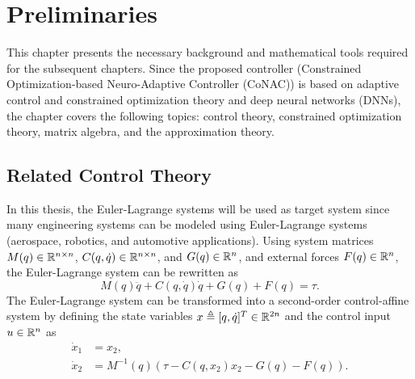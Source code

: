 
\chapter{Preliminaries} \label{chapter2}

This chapter presents the necessary background and mathematical tools required for the subsequent chapters.
Since the proposed controller (Constrained Optimization-based Neuro-Adaptive Controller (CoNAC)) is based on adaptive control and constrained optimization theory and deep neural networks (DNNs), the chapter covers the following topics: control theory, constrained optimization theory, matrix algebra, and the approximation theory.

\section{Related Control Theory} \label{chap2:sec:ctrl}


In this thesis, the Euler-Lagrange systems will be used as target system since many engineering systems can be modeled using Euler-Lagrange systems (\eg aerospace, robotics, and automotive applications).
Using system matrices $M(q)\in\mathbb{R}^{n\times n}$, $C(q,\dot{q})\in\mathbb{R}^{n\times n}$, and $G(q)\in\mathbb{R}^{n}$, and external forces $F(q)\in\mathbb{R}^n$, the Euler-Lagrange system can be rewritten as
\begin{equation}
    M(q)\ddot{q} + C(q,\dot{q})\dot{q} + G(q) +F(q)= \tau
    .
    \label{chap2:eq:EL}
\end{equation}
The Euler-Lagrange system can be transformed into a second-order control-affine system by defining the state variables $x\triangleq [q,\dot{q}]^T\in\mathbb{R}^{2n}$ and the control input $u\in\mathbb{R}^n$ as
\begin{equation}
    \begin{aligned}
        \dot{x}_1 &= x_2,\\
        \dot{x}_2 &= M^{-1}(q)(\tau - C(q,x_2)x_2 - G(q) - F(q))
        .
    \end{aligned}
\end{equation}

